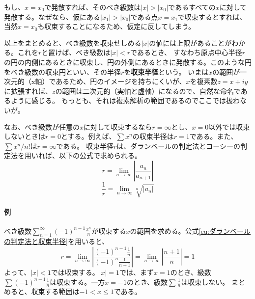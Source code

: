 \documentclass[a4j,dvipdfmx]{jsarticle}
\begin{document}
                もし、$x=x_0$で発散すれば、そのべき級数は$|x|>|x_0|$であるすべての$x$に対して発散する。なぜなら、仮にある$|x_1|>|x_0|$である点$x=x_1$で収束するとすれば、当然$x=x_0$も収束することになるため、仮定に反してしまう。

                以上をまとめると、べき級数を収束せしめる$|x|$の値には上限があることがわかる。これを$r$と置けば、べき級数は$|x|<r$であるとき、
                すなわち原点中心半径$r$の円の内側にあるときに収束し、円の外側にあるときに発散する。このような円をべき級数の収束円といい、その半径$r$を\textbf{収束半径}という。
                いまは$x$の範囲が一次元的（x軸）であるため、円のイメージを持ちにくいが、$x$を複素数$z=x+iy$に拡張すれば、$z$の範囲は二次元的（実軸と虚軸）になるので、自然な命名であるように感じる。
                もっとも、それは複素解析の範囲であるのでここでは扱わないが。

                なお、べき級数が任意の$x$に対して収束するなら$r=\infty$とし、$x=0$以外では収束しないときは$r=0$とする。例えば、$\sum x^n$の収束半径は$r=1$である。また、$\sum x^n/n!$は$r=\infty$である。
                \clearpage
                収束半径$r$は、ダランベールの判定法とコーシーの判定法を用いれば、以下の公式で求められる。
                \begin{equation}
                    r=\lim_{n\to\infty}\left|\frac{a_n}{a_{n+1}}\right|\label{eq:ダランベールの判定法と収束半径}
                \end{equation}
                \begin{equation}
                    \frac{1}{r}=\lim_{n\to\infty}\sqrt[n]{|a_n|}\label{eq:コーシーの判定法と収束半径}
                \end{equation}

                \paragraph{例}べき級数$\displaystyle\sum_{n=1}^\infty(-1)^{n-1}\frac{x^n}{n}$が収束する$x$の範囲を求める。公式\eqref{eq:ダランベールの判定法と収束半径}を用いると、
                \begin{equation*}
                    r=\lim_{n\to\infty}\left|\frac{(-1)^{n-1}\frac{1}{n}}{(-1)^n\frac{1}{n+1}}\right|=\lim_{n\to\infty}\left|\frac{n+1}{n}\right|=1
                \end{equation*}
                よって、$|x|<1$では収束する。$|x|=1$では、まず$x=1$のとき、級数$\sum (-1)^{n-1}\frac{1}{n}$は収束する。一方$x=-1$のとき、級数$\sum \frac{1}{n}$は収束しない。
                まとめると、収束する範囲は$-1<x\leq 1$である。
\end{document}
